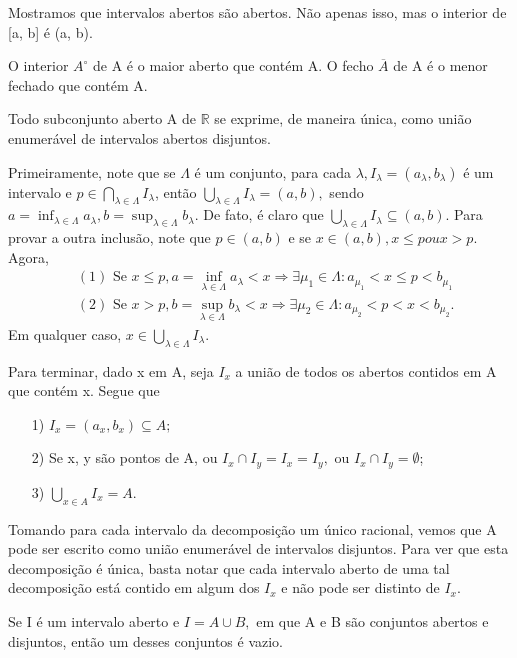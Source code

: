 \documentclass[Analysis/analysis_notes.tex]{subfiles}
\begin{document}
\begin{example}
	Mostramos que intervalos abertos s\~ao abertos. N\~ao apenas isso, mas o interior de [a, b] \'e (a, b).
\end{example}
\begin{example}
	O interior $A^{\circ}$ de A \'e o maior aberto que cont\'em A. O fecho $\overline{A}$ de A \'e o menor fechado que cont\'em A.
\end{example}
\begin{theorem*}
	Todo subconjunto aberto A de $\mathbb{R}$ se exprime, de maneira \'unica, como uni\~ao enumer\'avel de intervalos abertos disjuntos.
\end{theorem*}
\begin{proof*}
	Primeiramente, note que se $\Lambda $ \'e um conjunto, para cada $\lambda, I_{\lambda }=(a_{\lambda }, b_{\lambda })$ \'e um intervalo
	e $p\in\bigcap_{\lambda \in\Lambda }^{}{I_{\lambda }}$, ent\~ao $\bigcup_{\lambda \in\Lambda }^{}{I_{\lambda }}=(a, b),$ sendo
	$a = \inf_{\lambda \in\Lambda }a_{\lambda }, b = \sup_{\lambda \in\Lambda }b_{\lambda }.$ De fato, \'e claro que $\bigcup_{\lambda \in\Lambda }^{}{I_{\lambda }}\subseteq{(a, b)}$.
	Para provar a outra inclus\~ao, note que $p\in(a, b)$ e se $x\in(a, b), x\leq p ou x > p.$ Agora,
	\begin{align*}
		 & (1) \text{ Se }  x\leq p, a = \inf_{\lambda \in\Lambda }a_{\lambda } < x \Rightarrow \exists \mu_{1}\in\Lambda: a_{\mu_{1}}<x\leq p < b_{\mu_{1}} \\
		 & (2) \text{ Se } x > p, b=\sup_{\lambda \in\Lambda }b_{\lambda } < x \Rightarrow \exists \mu_{2}\in\Lambda: a_{\mu_{2}} < p < x < b_{\mu_{2}}.
	\end{align*}
	Em qualquer caso,  $x\in \bigcup_{\lambda \in\Lambda }^{}{I_{\lambda }}.$

	Para terminar, dado x em A, seja $I_{x}$ a uni\~ao de todos os abertos contidos em A que cont\'em x. Segue que
	\begin{itemize}
		\item[1)] $I_{x} = (a_{x}, b_{x})\subseteq{A};$
		\item[2)] Se x, y s\~ao pontos de A, ou $I_{x}\cap I_{y}=I_{x} = I_{y},$ ou $I_{x}\cap I_{y} = \emptyset$;
		\item[3)] $\bigcup_{x\in A}^{}{I_{x}} = A.$
	\end{itemize}
	Tomando para cada intervalo da decomposi\c c\~ao um \'unico racional, vemos que A pode ser escrito como uni\~ao enumer\'avel de
	intervalos disjuntos. Para ver que esta decomposi\c c\~ao \'e \'unica, basta notar que cada intervalo aberto de uma tal decomposi\c c\~ao
	est\'a contido em algum dos $I_{x}$ e n\~ao pode ser distinto de $I_{x}.$ \qedsymbol
\end{proof*}
\begin{crl*}
	Se I \'e um intervalo aberto e $I = A\cup B,$ em que A e B s\~ao conjuntos abertos e disjuntos, ent\~ao um desses conjuntos \'e vazio.
\end{crl*}
\end{document}
